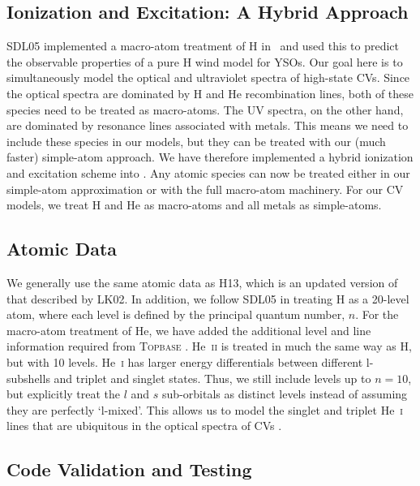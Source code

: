 \documentclass[preprint, a4paper, 11pt]{aastex}
\begin{document}
\subsection{Ionization and Excitation: A Hybrid Approach}

SDL05 implemented a macro-atom treatment of H in \py\ and used
this to predict the observable properties of a pure H wind
model for YSOs. Our goal here is to simultaneously model the optical
and ultraviolet spectra of high-state CVs. Since the optical spectra
are dominated by H and He recombination lines, both of these species
need to be treated as macro-atoms. The UV spectra, on the other hand,
are dominated by resonance lines associated with metals. This means we
need to include these species in our models, but they can be treated 
with our (much faster) simple-atom approach. We have therefore
implemented a hybrid ionization and excitation scheme into \py. Any
atomic species can now be treated either in our simple-atom
approximation or with the full macro-atom machinery. For our CV
models, we treat H and He as macro-atoms and all metals as
simple-atoms.  

\subsection{Atomic Data}

We generally use the same atomic data as H13, which is an updated
version of that described by LK02. In addition, we follow SDL05 in
treating H as a 20-level atom, where each level is defined by
the principal quantum number, $n$. For the macro-atom treatment of
He, we have added the additional level and line information required 
from \textsc{Topbase} \citep{topbase2005}.  He~\textsc{ii} is treated
in much the same way as H, but with 10 levels. He~\textsc{i} has
larger energy differentials between different l-subshells and triplet
and singlet states. Thus, we still include levels up to $n=10$, but
explicitly treat the $l$ and $s$ sub-orbitals as distinct levels
instead of assuming they are perfectly `l-mixed'. This allows us
to model the singlet and  triplet He~\textsc{i} lines that are ubiquitous
in the optical spectra of CVs \citep[e.g.][]{dhillon1996}.


\subsection{Code Validation and Testing}
\end{document}
